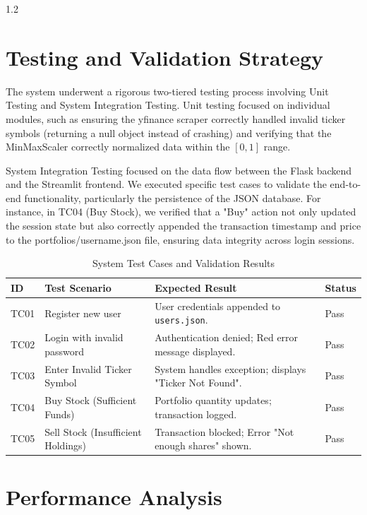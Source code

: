 \documentclass[12pt, a4paper]{report}
\begin{document}
\begin{spacing}{1.2}
\section{Testing and Validation Strategy}
The system underwent a rigorous two-tiered testing process involving Unit Testing and System Integration Testing. Unit testing focused on individual modules, such as ensuring the yfinance scraper correctly handled invalid ticker symbols (returning a null object instead of crashing) and verifying that the MinMaxScaler correctly normalized data within the $[0, 1]$ range.

System Integration Testing focused on the data flow between the Flask backend and the Streamlit frontend. We executed specific test cases to validate the end-to-end functionality, particularly the persistence of the JSON database. For instance, in TC04 (Buy Stock), we verified that a "Buy" action not only updated the session state but also correctly appended the transaction timestamp and price to the portfolios/username.json file, ensuring data integrity across login sessions.

\begin{table}[H]
    \centering
    \caption{System Test Cases and Validation Results}
    \begin{tabular}{|p{1.5cm}|p{5cm}|p{5cm}|p{2cm}|}
        \hline
        \textbf{ID} & \textbf{Test Scenario} & \textbf{Expected Result} & \textbf{Status} \\
        \hline
        TC01 & Register new user & User credentials appended to \texttt{users.json}. & Pass \\
        \hline
        TC02 & Login with invalid password & Authentication denied; Red error message displayed. & Pass \\
        \hline
        TC03 & Enter Invalid Ticker Symbol & System handles exception; displays "Ticker Not Found". & Pass \\
        \hline
        TC04 & Buy Stock (Sufficient Funds) & Portfolio quantity updates; transaction logged. & Pass \\
        \hline
        TC05 & Sell Stock (Insufficient Holdings) & Transaction blocked; Error "Not enough shares" shown. & Pass \\
        \hline
    \end{tabular}
\end{table}

\section{Performance Analysis}

\end{spacing}
\end{document}
